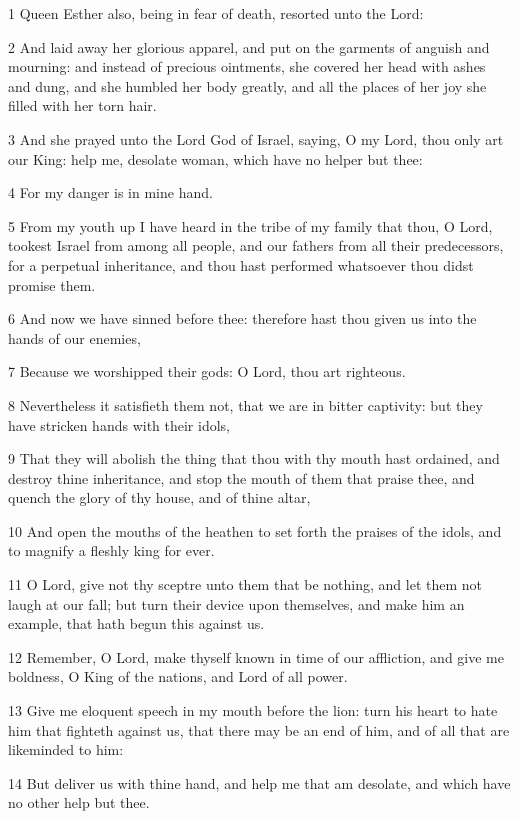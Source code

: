 \par 1 Queen Esther also, being in fear of death, resorted unto the Lord:
\par 2 And laid away her glorious apparel, and put on the garments of anguish and mourning: and instead of precious ointments, she covered her head with ashes and dung, and she humbled her body greatly, and all the places of her joy she filled with her torn hair.
\par 3 And she prayed unto the Lord God of Israel, saying, O my Lord, thou only art our King: help me, desolate woman, which have no helper but thee:
\par 4 For my danger is in mine hand.
\par 5 From my youth up I have heard in the tribe of my family that thou, O Lord, tookest Israel from among all people, and our fathers from all their predecessors, for a perpetual inheritance, and thou hast performed whatsoever thou didst promise them.
\par 6 And now we have sinned before thee: therefore hast thou given us into the hands of our enemies,
\par 7 Because we worshipped their gods: O Lord, thou art righteous.
\par 8 Nevertheless it satisfieth them not, that we are in bitter captivity: but they have stricken hands with their idols,
\par 9 That they will abolish the thing that thou with thy mouth hast ordained, and destroy thine inheritance, and stop the mouth of them that praise thee, and quench the glory of thy house, and of thine altar,
\par 10 And open the mouths of the heathen to set forth the praises of the idols, and to magnify a fleshly king for ever.
\par 11 O Lord, give not thy sceptre unto them that be nothing, and let them not laugh at our fall; but turn their device upon themselves, and make him an example, that hath begun this against us.
\par 12 Remember, O Lord, make thyself known in time of our affliction, and give me boldness, O King of the nations, and Lord of all power.
\par 13 Give me eloquent speech in my mouth before the lion: turn his heart to hate him that fighteth against us, that there may be an end of him, and of all that are likeminded to him:
\par 14 But deliver us with thine hand, and help me that am desolate, and which have no other help but thee.
